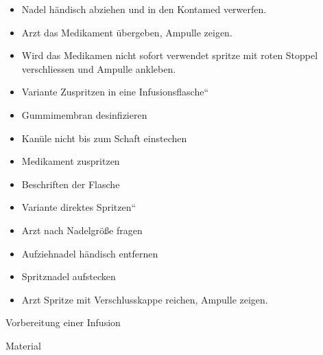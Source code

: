 \documentclass{article}
\begin{document}
\begin{itemize}
\item {\mdseries
Nadel h\"andisch abziehen und in den Kontamed verwerfen. }

\item {\mdseries
Arzt das Medikament \"ubergeben, Ampulle zeigen.}

\item {\mdseries
Wird das Medikamen nicht sofort verwendet spritze mit roten Stoppel
verschliessen und Ampulle ankleben.}

\end{itemize}
\begin{itemize}
\item {\mdseries
Variante {\quotedblbase}Zuspritzen in eine
Infusionsflasche{\textquotedblleft}}

\end{itemize}
\begin{itemize}
\item {\mdseries
Gummimembran desinfizieren}

\item {\mdseries
Kan\"ule nicht bis zum Schaft einstechen}

\item {\mdseries
Medikament zuspritzen}

\item {\mdseries
Beschriften der Flasche}

\end{itemize}
\begin{itemize}
\item {\mdseries
Variante {\quotedblbase}direktes Spritzen{\textquotedblleft}}

\end{itemize}
\begin{itemize}
\item {\mdseries
Arzt nach Nadelgr\"o{\ss}e fragen}

\item {\mdseries
Aufziehnadel h\"andisch entfernen}

\item {\mdseries
Spritznadel aufstecken}

\item {\mdseries
Arzt Spritze mit Verschlusskappe reichen, Ampulle zeigen.}

\end{itemize}
{\mdseries\color[rgb]{0.0,0.0,0.5019608}
Vorbereitung einer Infusion}

{\mdseries\color{black}
Material}
\end{document}

